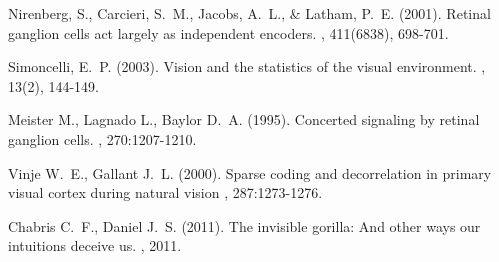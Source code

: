 \documentclass[twoside]{article}
\begin{document}
\begin{multicols}{2}
\begin{thebibliography}{99}
Nirenberg, S., Carcieri, S.~M., Jacobs, A.~L., \& Latham, P.~E. (2001).
\newblock Retinal ganglion cells act largely as independent encoders.
, 411(6838), 698-701.

Simoncelli, E.~P. (2003).
\newblock  Vision and the statistics of the visual environment.
, 13(2), 144-149.

\bibitem[Meister et. al., 1995]
Meister M., Lagnado L., Baylor D.~A. (1995). 
\newblock Concerted signaling by retinal ganglion cells. 
, 270:1207-1210.

\bibitem[Vinje 2000]
Vinje W.~E., Gallant J.~L. (2000).
\newblock Sparse coding and decorrelation in primary visual cortex during natural vision
, 287:1273-1276.

\bibitem[Chabris et. al. 2011]
Chabris C.~F., Daniel J.~S. (2011).
\newblock The invisible gorilla: And other ways our intuitions deceive us. , 2011.

 
\end{thebibliography}



\end{multicols}
\end{document}
